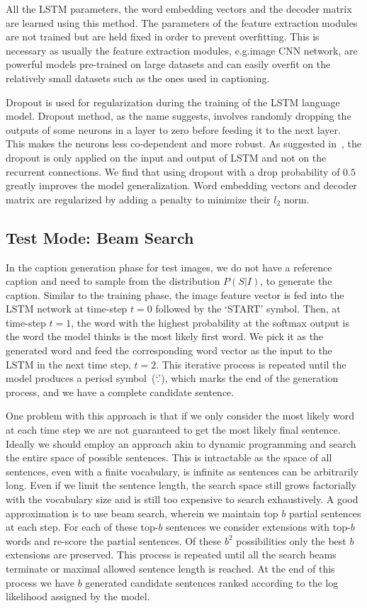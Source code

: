 All the LSTM parameters, the word embedding vectors and the decoder matrix are
learned using this method.
The parameters of the feature extraction modules are not trained but are held
fixed in order to prevent overfitting.
This is necessary as usually the feature extraction modules, e.g.\@ image CNN
network, are powerful models pre-trained on large datasets and can easily
overfit on the relatively small datasets such as the ones used in captioning.

Dropout is used for regularization during the training of the LSTM language
model.
Dropout method, as the name suggests, involves randomly dropping the outputs
of some neurons in a layer to zero before feeding it to the next layer.
This makes the neurons less co-dependent and more robust.
As suggested in~\cite{ZarembaSV14}, the dropout is only applied on the input and
output of LSTM and not on the recurrent connections.
We find that using dropout with a drop probability of $0.5$ greatly improves the
model generalization.
Word embedding vectors and decoder matrix are regularized by adding a penalty to
minimize their $l_2$ norm.

\subsection{Test Mode: Beam Search}
In the caption generation phase for test images, we do not have a reference
caption and need to sample from the distribution $P(S|I)$, to generate the
caption.
Similar to the training phase, the image feature vector is fed into the LSTM
network at time-step $t=0$ followed by the `START' symbol.
Then, at time-step $t=1$, the word with the highest probability at the softmax
output is the word the model thinks is the most likely first word.
We pick it as the generated word and feed the corresponding word vector as the
input to the LSTM in the next time step, $t=2$.
This iterative process is repeated until the model produces a period
symbol~(`.'), which marks the end of the generation process, and we have a
complete candidate sentence.

One problem with this approach is that if we only consider the most likely word
at each time step we are not guaranteed to get the most likely final sentence.
Ideally we should employ an approach akin to dynamic programming and search the
entire space of possible sentences.
This is intractable as the space of all sentences, even with a finite
vocabulary, is infinite as sentences can be arbitrarily long.
Even if we limit the sentence length, the search space still grows factorially
with the vocabulary size and is still too expensive to search exhaustively.
A good approximation is to use beam search, wherein we maintain top $b$ partial
sentences at each step.
For each of these top-$b$ sentences we consider extensions with top-$b$ words
and re-score the partial sentences.
Of these $b^2$ possibilities only the best $b$ extensions are preserved.
This process is repeated until all the search beams terminate or maximal
allowed sentence length is reached.
At the end of this process we have $b$ generated candidate sentences ranked
according to the log likelihood assigned by the model.

